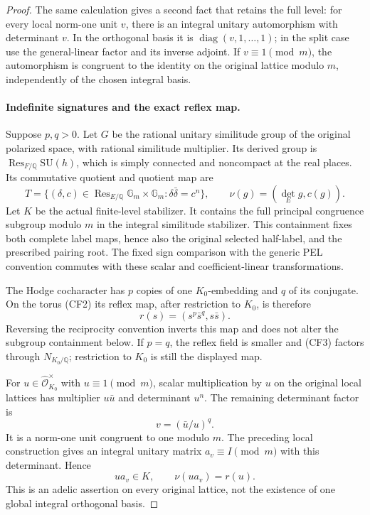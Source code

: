 \begin{proof}
The same calculation gives a second fact that retains the full level:
for every local norm-one unit $v$, there is an integral unitary
automorphism with determinant $v$.  In the orthogonal basis it is
$\operatorname{diag}(v,1,\ldots,1)$; in the split case use the
general-linear factor and its inverse adjoint.  If $v\equiv1\pmod m$,
the automorphism is congruent to the identity on the original lattice
modulo $m$, independently of the chosen integral basis.

\paragraph{Indefinite signatures and the exact reflex map.}
Suppose $p,q>0$.  Let $G$ be the rational unitary similitude group of
the original polarized space, with rational similitude multiplier.
Its derived group is $\operatorname{Res}_{F/\mathbb Q}\mathrm{SU}(h)$,
which is simply connected and noncompact at the real places.
Its commutative quotient and quotient map are
\[
 T=\{(\delta,c)\in\operatorname{Res}_{E/\mathbb Q}\mathbb G_m
                      \times\mathbb G_m:\delta\bar\delta=c^n\},
 \qquad \nu(g)=(\det_E g,c(g)).
                                                        \tag{CF2}
\]
Let $K$ be the actual finite-level stabilizer.  It contains the full
principal congruence subgroup modulo $m$ in the integral similitude
stabilizer.  This containment fixes both complete label maps, hence
also the original selected half-label, and the prescribed pairing
root.  The fixed sign comparison with the generic PEL convention
commutes with these scalar and coefficient-linear transformations.

The Hodge cocharacter has $p$ copies of one $K_0$-embedding and $q$
of its conjugate.  On the torus (CF2) its reflex map, after restriction
to $K_0$, is therefore
\[
        r(s)=(s^p\bar s^q,s\bar s).
                                                        \tag{CF3}
\]
Reversing the reciprocity convention inverts this map and does not
alter the subgroup containment below.  If $p=q$, the reflex field
is smaller and (CF3) factors through $N_{K_0/\mathbb Q}$; restriction
to $K_0$ is still the displayed map.

For $u\in\widehat{\mathcal O}_{K_0}^{\times}$ with
$u\equiv1\pmod m$, scalar multiplication by $u$ on the original
local lattices has multiplier $u\bar u$ and determinant $u^n$.
The remaining determinant factor is
\[
                         v=(\bar u/u)^q.
\]
It is a norm-one unit congruent to one modulo $m$.
The preceding local construction gives an integral unitary matrix
$a_v\equiv I\pmod m$ with this determinant.  Hence
\[
                  ua_v\in K,\qquad \nu(ua_v)=r(u).
                                                        \tag{CF4}
\]
This is an adelic assertion on every original lattice, not the
existence of one global integral orthogonal basis.


\end{proof}
